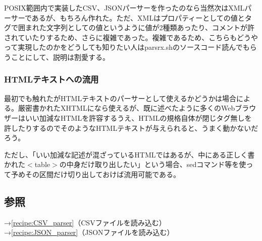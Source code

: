 POSIX範囲内で実装したCSV、JSONパーサーを作ったのなら当然次はXMLパーサーであるが、もちろん作れた。ただ、XMLはプロパティーとしての値とタグで囲まれた文字列としての値というように値が2種類あったり、コメントが許されていたりするため、さらに複雑であった。複雑であるため、こちらもどうやって実現したのかをどうしても知りたい人はparsrx.shのソースコード読んでもらうことにして、説明は割愛する。

\subsubsection*{HTMLテキストへの流用}

最初でも触れたがHTMLテキストのパーサーとして使えるかどうかは場合による。厳密書かれたXHTMLになら使えるが、既に述べたように多くのWebブラウザーはいい加減なHTMLを許容するうえ、HTMLの規格自体が閉じタグ無しを許したりするのでそのようなHTMLテキストが与えられると、うまく動かないだろう。

ただし、「いい加減な記述が混ざっているHTMLではあるが、中にある正しく書かれた$<$table$>$の中身だけ取り出したい」という場合、sedコマンド等を使って予めその区間だけ切り出しておけば流用可能である。

\subsection*{参照}

\noindent
→\ref{recipe:CSV_parser}（CSVファイルを読み込む） \\
→\ref{recipe:JSON_parser}（JSONファイルを読み込む）
